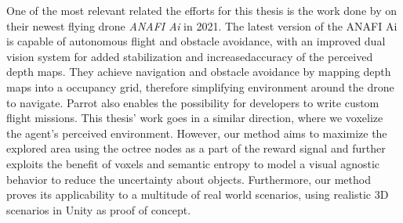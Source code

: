 %
One of the most relevant related the efforts for this thesis is the work done by \textcite{parrot2022anafiai} on their newest flying drone \textit{ANAFI Ai} in 2021. The latest version of the ANAFI Ai is capable of autonomous flight and obstacle avoidance, with an improved dual vision system for added stabilization and increasedaccuracy of the perceived depth maps. They achieve navigation and obstacle avoidance by mapping depth maps into a occupancy grid, therefore simplifying environment around the drone to navigate. Parrot also enables the possibility for developers to write custom flight missions.
This thesis' work goes in a similar direction, where we voxelize the agent's perceived environment. However, our method aims to maximize the explored area \cite{chaplot2020learning, chen2019learning, fang2019scene} using the octree nodes as a part of the reward signal and further exploits the benefit of voxels and semantic entropy to model a visual agnostic behavior to reduce the uncertainty about objects. Furthermore, our method proves its applicability to a multitude of real world scenarios, using realistic 3D scenarios in Unity as proof of concept.






